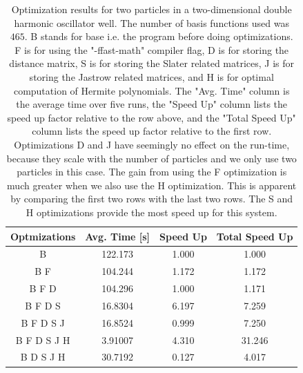 \documentclass[../main.tex]{subfiles}
\begin{document}
\begin{table}[!ht]
  \centering
  \begin{tabular}{ | c | c | c | c |}
    \hline
    Optmizations & Avg. Time [s] & Speed Up & Total Speed Up\\*
    \hline
    B & 122.173 & 1.000 & 1.000\\*
    \hline
    B F & 104.244 & 1.172 & 1.172\\*
    \hline
    B F D & 104.296 & 1.000 & 1.171\\*
    \hline
    B F D S & 16.8304 & 6.197 & 7.259\\*
    \hline
    B F D S J & 16.8524 & 0.999 & 7.250\\*
    \hline
    B F D S J H & 3.91007 & 4.310 & 31.246\\*
    \hline
    B D S J H & 30.7192 & 0.127 & 4.017\\*
    \hline
  \end{tabular}
  \caption{Optimization results for two particles in a two-dimensional double harmonic oscillator well. The number of basis functions used was $465$. B stands for base i.e. the program before doing optimizations. F is for using the "-ffast-math" compiler flag, D is for storing the distance matrix, S is for storing the Slater related matrices, J is for storing the Jastrow related matrices, and H is for optimal computation of Hermite polynomials. The "Avg. Time" column is the average time over five runs, the "Speed Up" column lists the speed up factor relative to the row above, and the "Total Speed Up" column lists the speed up factor relative to the first row. Optimizations D and J have seemingly no effect on the run-time, because they scale with the number of particles and we only use two particles in this case. The gain from using the F optimization is much greater when we also use the H optimization. This is apparent by comparing the first two rows with the last two rows. The S and H optimizations provide the most speed up for this system.}
  \label{tab: OptimizationExpansion}
\end{table}
\end{document}
